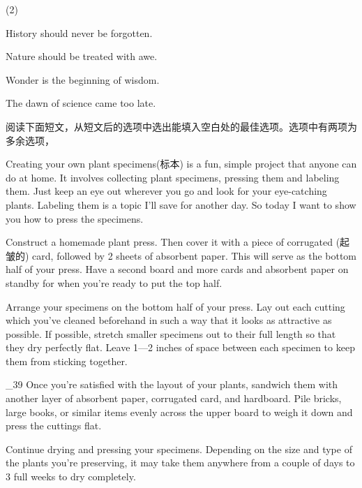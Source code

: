 \documentclass{英语试卷}
\begin{document}
\begin{choices}(2)
  \item History should never be forgotten.
  \item Nature should be treated with awe.
  \item Wonder is the beginning of wisdom.
  \item The dawn of science came too late.
\end{choices}
\par 阅读下面短文，从短文后的选项中选出能填入空白处的最佳选项。选项中有两项为多余选项，\par
\par Creating your own plant specimens(标本) is a fun, simple project that anyone can do at home. It involves collecting plant specimens, pressing them and labeling them.  Just keep an eye out wherever you go and look for your eye-catching plants. Labeling them is a topic I'll save for another day. So today I want to show you how to press the specimens.\par
\par Construct a homemade plant press.  Then cover it with a piece of corrugated (起皱的) card, followed by 2 sheets of absorbent paper. This will serve as the bottom half of your press. Have a second board and more cards and absorbent paper on standby for when you're ready to put the top half.\par
\par Arrange your specimens on the bottom half of your press. Lay out each cutting which you've cleaned beforehand in such a way that it looks as attractive as possible.  If possible, stretch smaller specimens out to their full length so that they dry perfectly flat. Leave 1—2 inches of space between each specimen to keep them from sticking together.\par
\par \_39 Once you're satisfied with the layout of your plants, sandwich them with another layer of absorbent paper, corrugated card, and hardboard. Pile bricks, large books, or similar items evenly across the upper board to weigh it down and press the cuttings flat.\par
\par Continue drying and pressing your specimens.  Depending on the size and type of the plants you're preserving, it may take them anywhere from a couple of days to 3 full weeks to dry completely.\par
\end{document}
